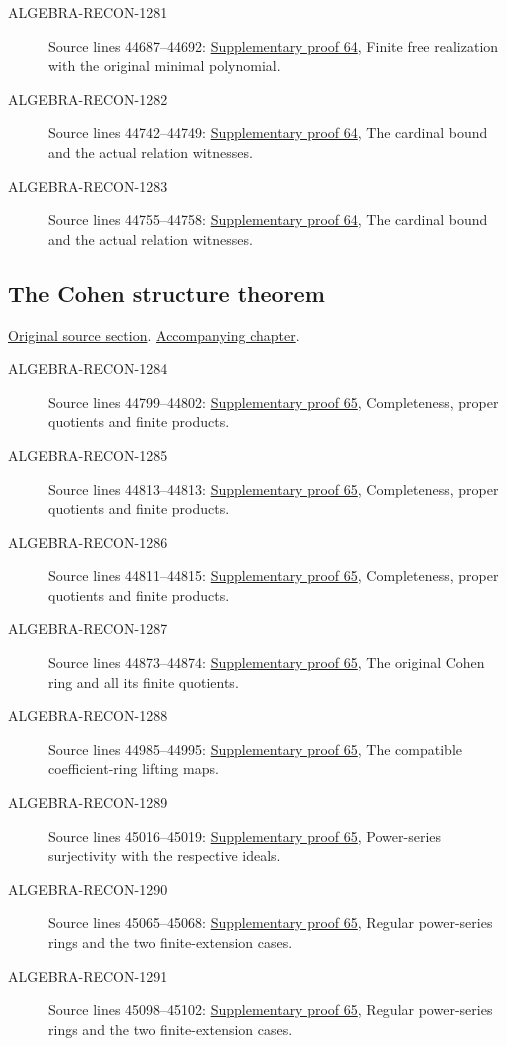 \begin{description}
\item[ALGEBRA-RECON-1281] Source lines 44687--44692: \hyperlink{algebra_construct_flat_notes_20260929}{Supplementary proof 64}, Finite free realization with the original minimal polynomial.
\item[ALGEBRA-RECON-1282] Source lines 44742--44749: \hyperlink{algebra_construct_flat_notes_20260929}{Supplementary proof 64}, The cardinal bound and the actual relation witnesses.
\item[ALGEBRA-RECON-1283] Source lines 44755--44758: \hyperlink{algebra_construct_flat_notes_20260929}{Supplementary proof 64}, The cardinal bound and the actual relation witnesses.
\end{description}

\subsection{The Cohen structure theorem}
\hypertarget{algebra-source-section-cohen-structure-theorem}{}
\noindent\href{https://github.com/stacks/stacks-project/blob/a04446e57ec1fbc252a871afcec7752fb2807b14/algebra.tex\#L44779}{Original source section}. \href{algebra.pdf\#nameddest=section-cohen-structure-theorem}{Accompanying chapter}.

\begin{description}
\item[ALGEBRA-RECON-1284] Source lines 44799--44802: \hyperlink{algebra_cohen_notes_20260929}{Supplementary proof 65}, Completeness, proper quotients and finite products.
\item[ALGEBRA-RECON-1285] Source lines 44813--44813: \hyperlink{algebra_cohen_notes_20260929}{Supplementary proof 65}, Completeness, proper quotients and finite products.
\item[ALGEBRA-RECON-1286] Source lines 44811--44815: \hyperlink{algebra_cohen_notes_20260929}{Supplementary proof 65}, Completeness, proper quotients and finite products.
\item[ALGEBRA-RECON-1287] Source lines 44873--44874: \hyperlink{algebra_cohen_notes_20260929}{Supplementary proof 65}, The original Cohen ring and all its finite quotients.
\item[ALGEBRA-RECON-1288] Source lines 44985--44995: \hyperlink{algebra_cohen_notes_20260929}{Supplementary proof 65}, The compatible coefficient-ring lifting maps.
\item[ALGEBRA-RECON-1289] Source lines 45016--45019: \hyperlink{algebra_cohen_notes_20260929}{Supplementary proof 65}, Power-series surjectivity with the respective ideals.
\item[ALGEBRA-RECON-1290] Source lines 45065--45068: \hyperlink{algebra_cohen_notes_20260929}{Supplementary proof 65}, Regular power-series rings and the two finite-extension cases.
\item[ALGEBRA-RECON-1291] Source lines 45098--45102: \hyperlink{algebra_cohen_notes_20260929}{Supplementary proof 65}, Regular power-series rings and the two finite-extension cases.
\end{description}

